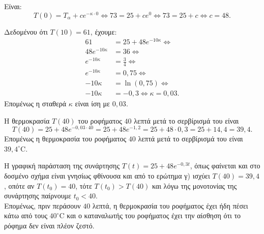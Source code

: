 \begin{alist}
\item Είναι:
\[T(0) = T_\alpha + ce^{-\kappa\cdot 0} \Leftrightarrow 73 = 25 + ce^0 \Leftrightarrow 73 = 25 + c \Leftrightarrow c = 48.\]
\item Δεδομένου ότι $T(10) = 61$, έχουμε:
\begin{align*}
61 &= 25 + 48e^{-10\kappa} \Leftrightarrow \\
48e^{-10\kappa} &= 36 \Leftrightarrow \\
e^{-10\kappa} &= \frac{3}{4} \Leftrightarrow \\
e^{-10\kappa} &= 0{,}75 \Leftrightarrow \\
-10\kappa &= \ln(0{,}75) \Leftrightarrow \\
-10\kappa &= -0{,}3 \Leftrightarrow \kappa = 0{,}03.
\end{align*}
Επομένως η σταθερά $\kappa$ είναι ίση με $0{,}03$.
\item Η θερμοκρασία $T(40)$ του ροφήματος $40$ λεπτά μετά το σερβίρισμά του είναι
\[T(40) = 25 + 48e^{-0{,}03\cdot 40} = 25 + 48e^{-1{,}2} = 25 + 48\cdot 0{,}3 = 25 + 14{,}4 = 39{,}4.\]
Επομένως η θερμοκρασία του ροφήματος $40$ λεπτά μετά το σερβίρισμά του είναι $39{,}4 ^\circ\text{C}$.
\item Η γραφική παράσταση της συνάρτησης $T(t) = 25 + 48e^{-0{,}3t}$, όπως φαίνεται και στο δοσμένο σχήμα είναι γνησίως φθίνουσα και από το ερώτημα γ) ισχύει $T(40) = 39{,}4$, οπότε αν $T(t_0) = 40$, τότε $T(t_0) > T(40)$ και λόγω της μονοτονίας της συνάρτησης παίρνουμε $t_0 < 40$. \\
Επομένως, πριν περάσουν $40$ λεπτά, η θερμοκρασία του ροφήματος έχει ήδη πέσει κάτω από τους $40 ^\circ\text{C}$ και ο καταναλωτής του ροφήματος έχει την αίσθηση ότι το ρόφημα δεν είναι πλέον ζεστό.
\end{alist}

